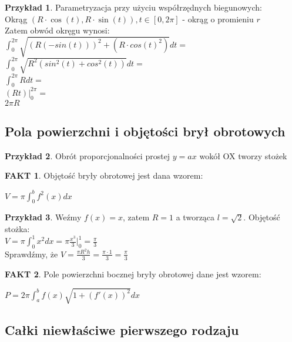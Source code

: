 \documentclass{article}
\theoremstyle{definition}
\theoremstyle{definition}
\theoremstyle{definition}
\newtheorem{pk}{Przykład}[subsection]
\theoremstyle{definition}
\newtheorem*{fakt}{FAKT}
\begin{document}
\begin{pk}
    Parametryzacja przy użyciu współrzędnych biegunowych:\\
    Okrąg $(R\cdot \cos(t), R\cdot \sin(t)), t\in[0,2\pi]$ - okrąg o promieniu $r$\\
    Zatem obwód okręgu wynosi:\\
    $\int_0^{2\pi} \sqrt{(R(-sin(t)))^2+(R\cdot cos(t)^2)} dt =$\\
    $\int_{0}^{2\pi} \sqrt{R^2(sin^2(t)+cos^2(t))} dt=$\\
    $\int_{0}^{2\pi} R dt=$\\
    $(Rt)|_0^{2\pi}=$\\
    $2\pi R$
\end{pk}

\subsection{Pola powierzchni i objętości brył obrotowych}

\begin{pk}
    Obrót proporcjonalności prostej $y=ax$ wokół OX tworzy stożek
\end{pk}

\begin{fakt}
    Objętość bryły obrotowej jest dana wzorem:
    \begin{center}
        $V=\pi \int_0^b f^2(x) dx$
    \end{center}
\end{fakt}

\begin{pk}
    Weźmy $f(x)=x$, zatem $R=1$ a tworząca $l=\sqrt{2}$. Objętość stożka:\\
    $V=\pi \int_{0}^{1} x^2 dx = \pi \frac{x^3}{3}|_0^1 = \frac{\pi}{3}$\\
    Sprawdźmy, że $V=\frac{\pi R^2 h}{3} = \frac{\pi \cdot 1 }{3} = \frac{\pi}{3}$
\end{pk}

\begin{fakt}
    Pole powierzchni bocznej bryły obrotowej dane jest wzorem:
    \begin{center}
        $P=2\pi \int_{a}^{b} f(x) \sqrt{1+(f'(x))^2}dx$
    \end{center}
\end{fakt}

\subsection{Całki niewłaściwe pierwszego rodzaju}
\end{document}
